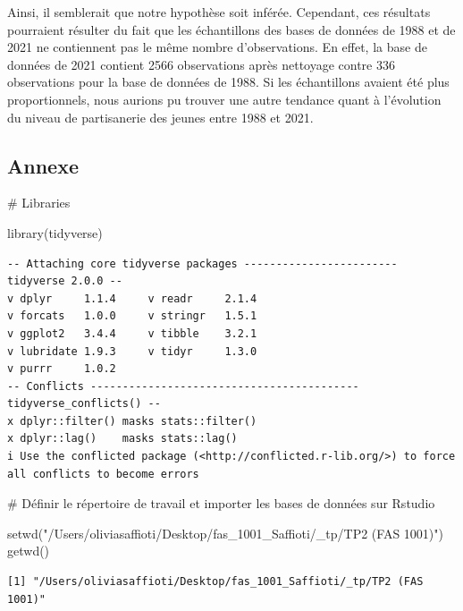 \documentclass[
  letterpaper,
  DIV=11,
  numbers=noendperiod]{scrartcl}
\newenvironment{Shaded}{\begin{snugshade}}{\end{snugshade}}
\newcommand{\CommentTok}[1]{\textcolor[rgb]{0.37,0.37,0.37}{#1}}
\newcommand{\FunctionTok}[1]{\textcolor[rgb]{0.28,0.35,0.67}{#1}}
\newcommand{\NormalTok}[1]{\textcolor[rgb]{0.00,0.23,0.31}{#1}}
\newcommand{\StringTok}[1]{\textcolor[rgb]{0.13,0.47,0.30}{#1}}
\begin{document}
Ainsi, il semblerait que notre hypothèse soit inférée. Cependant, ces
résultats pourraient résulter du fait que les échantillons des bases de
données de 1988 et de 2021 ne contiennent pas le même nombre
d'observations. En effet, la base de données de 2021 contient 2566
observations après nettoyage contre 336 observations pour la base de
données de 1988. Si les échantillons avaient été plus proportionnels,
nous aurions pu trouver une autre tendance quant à l'évolution du niveau
de partisanerie des jeunes entre 1988 et 2021.

\hypertarget{annexe}{%
\subsection{Annexe}\label{annexe}}

\begin{Shaded}
\begin{Highlighting}[]
\CommentTok{\# Libraries}

\FunctionTok{library}\NormalTok{(tidyverse)}
\end{Highlighting}
\end{Shaded}

\begin{verbatim}
-- Attaching core tidyverse packages ------------------------ tidyverse 2.0.0 --
v dplyr     1.1.4     v readr     2.1.4
v forcats   1.0.0     v stringr   1.5.1
v ggplot2   3.4.4     v tibble    3.2.1
v lubridate 1.9.3     v tidyr     1.3.0
v purrr     1.0.2     
-- Conflicts ------------------------------------------ tidyverse_conflicts() --
x dplyr::filter() masks stats::filter()
x dplyr::lag()    masks stats::lag()
i Use the conflicted package (<http://conflicted.r-lib.org/>) to force all conflicts to become errors
\end{verbatim}

\begin{Shaded}
\begin{Highlighting}[]
\CommentTok{\# Définir le répertoire de travail et importer les bases de données sur Rstudio}

\FunctionTok{setwd}\NormalTok{(}\StringTok{"/Users/oliviasaffioti/Desktop/fas\_1001\_Saffioti/\_tp/TP2 (FAS 1001)"}\NormalTok{)}
\FunctionTok{getwd}\NormalTok{()}
\end{Highlighting}
\end{Shaded}

\begin{verbatim}
[1] "/Users/oliviasaffioti/Desktop/fas_1001_Saffioti/_tp/TP2 (FAS 1001)"
\end{verbatim}
\end{document}
